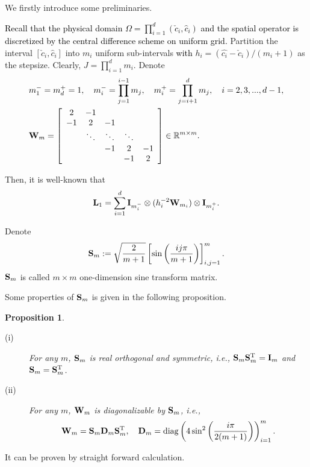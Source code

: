 \documentclass[11pt]{article}%
\numberwithin{equation}{section}
\newtheorem{proposition}{Proposition}
\newenvironment{proof}{\noindent{\bf Proof:}}{\hfill\fbox{}\vspace*{1mm}}
\begin{document}
We firstly introduce some preliminaries.
	
\textcolor{black}{Recall that the physical domain $\Omega=\prod\limits_{i=1}^{d}(\check{c}_i,\hat{c}_i)$ and the spatial operator is discretized by \textcolor{black}{the} central difference scheme on uniform grid.} Partition the interval $[\check{c}_i,\hat{c}_i]$ into $m_i$ uniform sub-intervals \textcolor{black}{with} $h_i=(\hat{c_i}-\check{c}_i)/(m_i+1)$ as the stepsize. Clearly, $J=\prod\limits_{i=1}^{d}m_i$. Denote
\begin{align*}
&m_1^{-}=m_d^{+}=1,\quad m_i^{-}=\prod\limits_{j=1}^{i-1}m_j,\quad m_i^{+}=\prod\limits_{j=i+1}^{d}m_j,\quad  i=2,3,...,d-1,\\
&{\bf W}_m=\left[
\begin{array}
	[c]{ccccc}
	2&-1 &   &  & \\
	-1& 2&-1  &&\\
	~&\ddots &\ddots&\ddots&~\\
	~ & ~&-1&2 &-1\\
	~& ~&~& -1 & 2
\end{array}
\right]\in\mathbb{R}^{m\times m}.
\end{align*}

Then, it is well-known that
\begin{align*}
{\bf L}_1=\sum\limits_{i=1}^{d}{\bf I}_{m_i^{-}}\otimes(h_i^{-2}{\bf W}_{m_i})\otimes{\bf I}_{m_i^{+}}.
\end{align*}

Denote
\begin{equation}\label{1dsinemat}
	{\bf S}_m:=\sqrt{\frac{2}{m+1}}\left[\sin\left(\frac{ij\pi}{m+1}\right)\right]_{i,j=1}^{m}.
\end{equation}
${\bf S}_m$ is called $m\times m$ one-dimension sine transform matrix. 

Some properties of ${\bf S}_m$ is given in the following proposition.
\begin{proposition}\label{smprop}
\begin{description}
\item[(i)] For any $m$, ${\bf S}_m$ is real orthogonal and symmetric, i.e., ${\bf S}_m{\bf S}_m^{\rm T}={\bf I}_m$ and ${\bf S}_m={\bf S}_{m}^{\rm T}$.
\item[(ii)]For any $m$, ${\bf W}_m$ is diagonalizable by ${\bf S}_m$, i.e.,
\begin{equation*}
{\bf W}_m={\bf S}_m{\bf D}_m{\bf S}_m^{\rm T},\quad {\bf D}_m={\rm diag}\left(4\sin^2\left(\frac{i\pi}{2(m+1)}\right)\right)_{i=1}^{m}.
\end{equation*}
\end{description}
\end{proposition}
\begin{proof}
It can be proven by straight forward calculation.
\end{proof}
\end{document}
